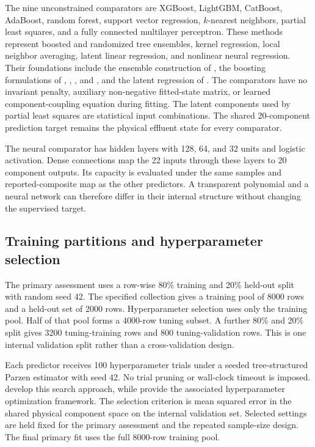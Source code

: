 The nine unconstrained comparators are XGBoost, LightGBM, CatBoost, AdaBoost, random forest, support vector regression, \(k\)-nearest neighbors, partial least squares, and a fully connected multilayer perceptron. These methods represent boosted and randomized tree ensembles, kernel regression, local neighbor averaging, latent linear regression, and nonlinear neural regression. Their foundations include the ensemble construction of \citet{Breiman2001}, the boosting formulations of \citet{Drucker1997}, \citet{ChenGuestrin2016}, \citet{Ke2017}, and \citet{Prokhorenkova2018}, and the latent regression of \citet{Wold2001}. The comparators have no invariant penalty, auxiliary non-negative fitted-state matrix, or learned component-coupling equation during fitting. The latent components used by partial least squares are statistical input combinations. The shared 20-component prediction target remains the physical effluent state for every comparator.

The neural comparator has hidden layers with 128, 64, and 32 units and logistic activation. Dense connections map the 22 inputs through these layers to 20 component outputs. Its capacity is evaluated under the same samples and reported-composite map as the other predictors. A transparent polynomial and a neural network can therefore differ in their internal structure without changing the supervised target.

\subsection{Training partitions and hyperparameter selection}

The primary assessment uses a row-wise 80\% training and 20\% held-out split with random seed 42. The specified collection gives a training pool of 8000 rows and a held-out set of 2000 rows. Hyperparameter selection uses only the training pool. Half of that pool forms a 4000-row tuning subset. A further 80\% and 20\% split gives 3200 tuning-training rows and 800 tuning-validation rows. This is one internal validation split rather than a cross-validation design.

Each predictor receives 100 hyperparameter trials under a seeded tree-structured Parzen estimator with seed 42. No trial pruning or wall-clock timeout is imposed. \citet{Bergstra2011} develop this search approach, while \citet{Akiba2019} provide the associated hyperparameter optimization framework. The selection criterion is mean squared error in the shared physical component space on the internal validation set. Selected settings are held fixed for the primary assessment and the repeated sample-size design. The final primary fit uses the full 8000-row training pool.

